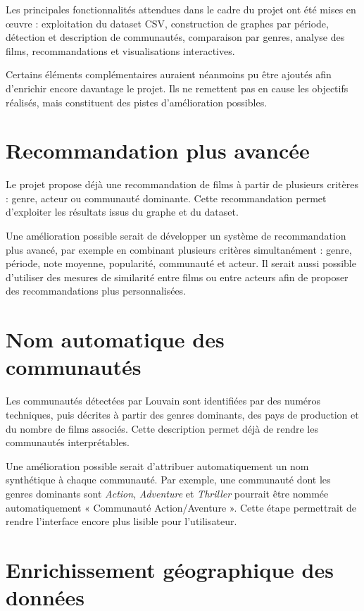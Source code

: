 \documentclass[11pt,a4paper,oneside,openany]{report}
\begin{document}
Les principales fonctionnalités attendues dans le cadre du projet ont été mises en œuvre : exploitation du dataset CSV, construction de graphes par période, détection et description de communautés, comparaison par genres, analyse des films, recommandations et visualisations interactives.

Certains éléments complémentaires auraient néanmoins pu être ajoutés afin d’enrichir encore davantage le projet. Ils ne remettent pas en cause les objectifs réalisés, mais constituent des pistes d’amélioration possibles.

\section{Recommandation plus avancée}

Le projet propose déjà une recommandation de films à partir de plusieurs critères : genre, acteur ou communauté dominante. Cette recommandation permet d’exploiter les résultats issus du graphe et du dataset.

Une amélioration possible serait de développer un système de recommandation plus avancé, par exemple en combinant plusieurs critères simultanément : genre, période, note moyenne, popularité, communauté et acteur. Il serait aussi possible d’utiliser des mesures de similarité entre films ou entre acteurs afin de proposer des recommandations plus personnalisées.

\section{Nom automatique des communautés}

Les communautés détectées par Louvain sont identifiées par des numéros techniques, puis décrites à partir des genres dominants, des pays de production et du nombre de films associés. Cette description permet déjà de rendre les communautés interprétables.

Une amélioration possible serait d’attribuer automatiquement un nom synthétique à chaque communauté. Par exemple, une communauté dont les genres dominants sont \textit{Action}, \textit{Adventure} et \textit{Thriller} pourrait être nommée automatiquement « Communauté Action/Aventure ». Cette étape permettrait de rendre l’interface encore plus lisible pour l’utilisateur.

\section{Enrichissement géographique des données}
\end{document}
